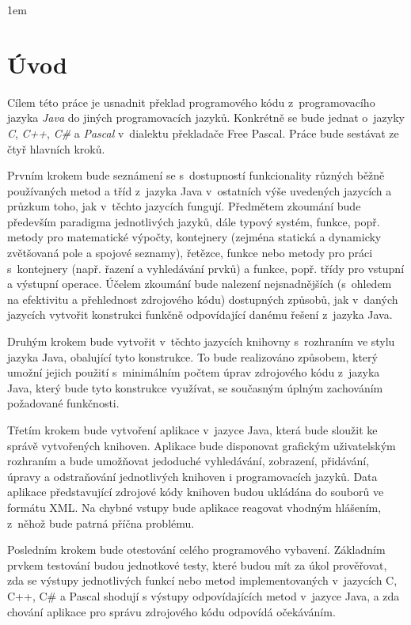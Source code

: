 \documentclass[onepage, a4paper, 12pt]{bakalarka}
\begin{document}
\tableofcontents
\pagestyle{fancy}
\renewcommand{\chaptermark}[1]{\markboth{\textit{#1}}{}}
\renewcommand{\sectionmark}[1]{\markright{\textit{#1}}{}}
\cfoot{\thepage}
\lhead{\leftmark}
\rhead{\rightmark}
\parskip 1em

\chapter{Úvod}
Cílem této práce je usnadnit překlad programového kódu z~programovacího jazyka \textit{Java} do jiných programovacích jazyků. Konkrétně se bude jednat o~jazyky \textit{C}, \textit{C++}, \textit{C\#} a \textit{Pascal} v~dialektu překladače Free Pascal. Práce bude sestávat ze čtyř hlavních kroků.\par
Prvním krokem bude seznámení se s~dostupností funkcionality různých běžně používaných metod a tříd z~jazyka Java v~ostatních výše uvedených jazycích a průzkum toho, jak v~těchto jazycích fungují. Předmětem zkoumání bude především paradigma jednotlivých jazyků, dále typový systém, funkce, popř. metody pro matematické výpočty, kontejnery (zejména statická a dynamicky zvětšovaná pole a spojové seznamy), řetězce, funkce nebo metody pro práci s~kontejnery (např. řazení a vyhledávání prvků) a funkce, popř. třídy pro vstupní a výstupní operace. Účelem zkoumání bude nalezení nejsnadnějších (s~ohledem na efektivitu a přehlednost zdrojového kódu) dostupných způsobů, jak v~daných jazycích vytvořit konstrukci funkčně odpovídající danému řešení z~jazyka Java.\par
Druhým krokem bude vytvořit v~těchto jazycích knihovny s~rozhraním ve stylu jazyka Java, obalující tyto konstrukce. To bude realizováno způsobem, který umožní jejich použití s~minimálním počtem úprav zdrojového kódu z~jazyka Java, který bude tyto konstrukce využívat, se současným úplným zachováním požadované funkčnosti.\par
Třetím krokem bude vytvoření aplikace v~jazyce Java, která bude sloužit ke správě vytvořených knihoven. Aplikace bude disponovat grafickým uživatelským rozhraním a bude umožňovat jedoduché vyhledávání, zobrazení, přidávání, úpravy a odstraňování jednotlivých knihoven i programovacích jazyků. Data aplikace představující zdrojové kódy knihoven budou ukládána do souborů ve formátu XML. Na chybné vstupy bude aplikace reagovat vhodným hlášením, z~něhož bude patrná příčna problému.\par
Posledním krokem bude otestování celého programového vybavení. Základním prvkem testování budou jednotkové testy, které budou mít za úkol prověřovat, zda se výstupy jednotlivých funkcí nebo metod implementovaných v~jazycích C, C++, C\# a Pascal shodují s výstupy odpovídajících metod v~jazyce Java, a zda chování aplikace pro správu zdrojového kódu odpovídá očekáváním.
\end{document}
